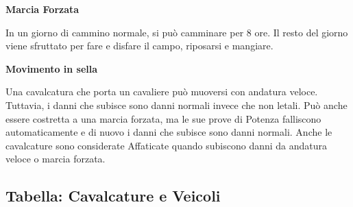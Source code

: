 \documentclass[a4paper,11pt,twoside,openany]{book}
\begin{document}
\bigskip

\textbf{Marcia Forzata}

In un giorno di cammino normale, si può camminare per 8 ore. Il resto del giorno viene sfruttato per fare e disfare il campo, riposarsi e mangiare.

\textbf{Movimento in sella}

Una cavalcatura che porta un cavaliere può muoversi con andatura veloce. Tuttavia, i danni che subisce sono danni normali invece che non letali. Può anche essere costretta a una marcia forzata, ma le sue prove di Potenza falliscono automaticamente e di nuovo i danni che subisce sono danni normali. Anche le cavalcature sono considerate Affaticate quando subiscono danni da andatura veloce o marcia forzata.

\subsection{Tabella: Cavalcature e Veicoli}

\medskip

\label{tabella-cavalcature-e-veicoli}
\end{document}
